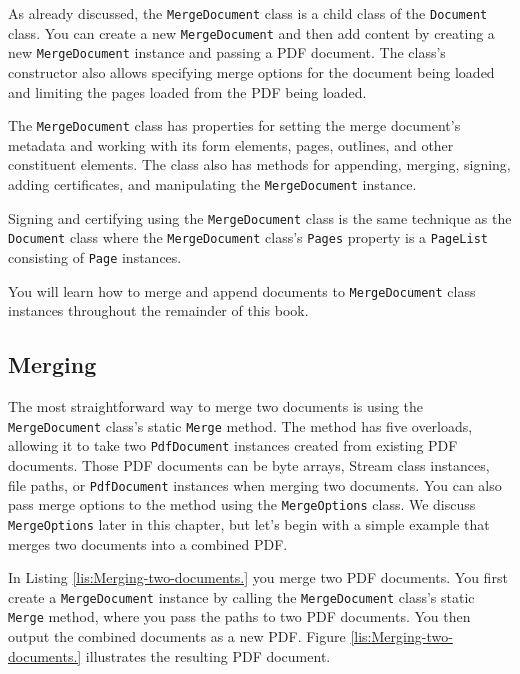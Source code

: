 \documentclass[american,letterpaper]{tufte-book}
\numberwithin{equation}{section}
\numberwithin{figure}{section}
\begin{document}
{{As already discussed, the \texttt{MergeDocument} class is a child
class of the \texttt{Document} class. You can create a new \texttt{MergeDocument}
and then add content by creating a new \texttt{MergeDocument} instance
and passing a PDF document. The class's constructor also allows specifying
merge options for the document being loaded and limiting the pages
loaded from the PDF being loaded. 

The \texttt{MergeDocument} class has properties for setting the merge
document's metadata and working with its form elements, pages, outlines,
and other constituent elements. The class also has methods for appending,
merging, signing, adding certificates, and manipulating the \texttt{MergeDocument}
instance.

Signing and certifying using the \texttt{MergeDocument} class is the
same technique as the \texttt{Document} class where the \texttt{MergeDocument}
class's \texttt{Pages} property is a \texttt{PageList} consisting
of \texttt{Page} instances. 

You will learn how to merge and append documents to \texttt{MergeDocument}
class instances throughout the remainder of this book.
\subsection{Merging}

The most straightforward way to merge two documents is using the \texttt{MergeDocument}
class's static \texttt{Merge} method. The method has five overloads,
allowing it to take two \texttt{PdfDocument} instances created from
existing PDF documents. Those PDF documents can be byte arrays, Stream
class instances, file paths, or \texttt{PdfDocument} instances when
merging two documents. You can also pass merge options to the method
using the \texttt{MergeOptions} class. We discuss \texttt{MergeOptions}
later in this chapter, but let's begin with a simple example that
merges two documents into a combined PDF.

In Listing \ref{lis:Merging-two-documents.} you merge two PDF documents.
You first create a \texttt{MergeDocument} instance by calling the
\texttt{MergeDocument} class's static \texttt{Merge} method, where
you pass the paths to two PDF documents. You then output the combined
documents as a new PDF. Figure \ref{lis:Merging-two-documents.} illustrates
the resulting PDF document.

}}
\end{document}
